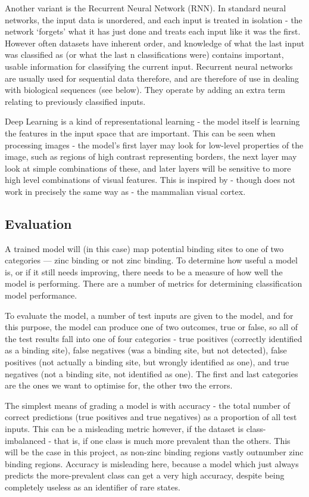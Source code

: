 Another variant is the Recurrent Neural Network (RNN). In standard neural networks, the input data is unordered, and each input is treated in isolation - the network `forgets' what it has just done and treats each input like it was the first. However often datasets have inherent order, and knowledge of what the last input was classified as (or what the last n classifications were) contains important, usable information for classifying the current input. Recurrent neural networks are usually used for sequential data therefore, and are therefore of use in dealing with biological sequences (see below). They operate by adding an extra term relating to previously classified inputs.

Deep Learning is a kind of representational learning - the model itself is learning the features in the input space that are important. This can be seen when processing images - the model's first layer may look for low-level properties of the image, such as regions of high contrast representing borders, the next layer may look at simple combinations of these, and later layers will be sensitive to more high level combinations of visual features. This is inspired by - though does not work in precisely the same way as - the mammalian visual cortex.

\subsection{Evaluation}

A trained model will (in this case) map potential binding sites to one of two categories --- zinc binding or not zinc binding. To determine how useful a model is, or if it still needs improving, there needs to be a measure of how well the model is performing. There are a number of metrics for determining classification model performance.

To evaluate the model, a number of test inputs are given to the model, and for this purpose, the model can produce one of two outcomes, true or false, so all of the test results fall into one of four categories - true positives (correctly identified as a binding site), false negatives (was a binding site, but not detected), false positives (not actually a binding site, but wrongly identified as one), and true negatives (not a binding site, not identified as one). The first and last categories are the ones we want to optimise for, the other two the errors.

The simplest means of grading a model is with accuracy - the total number of correct predictions (true positives and true negatives) as a proportion of all test inputs. This can be a misleading metric however, if the dataset is class-imbalanced - that is, if one class is much more prevalent than the others. This will be the case in this project, as non-zinc binding regions vastly outnumber zinc binding regions. Accuracy is misleading here, because a model which just always predicts the more-prevalent class can get a very high accuracy, despite being completely useless as an identifier of rare states.


